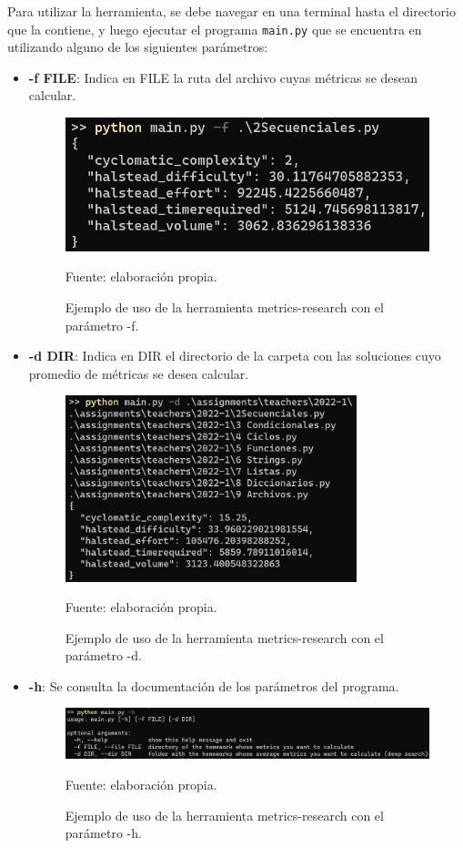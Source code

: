 \documentclass[letterpaper,12pt]{article}
\begin{document}
Para utilizar la herramienta, se debe navegar en una terminal hasta el directorio que la contiene, y luego ejecutar el programa \texttt{main.py} que se encuentra en utilizando alguno de los siguientes parámetros:

\begin{itemize}
  \item \textbf{-f FILE}: Indica en FILE la ruta del archivo cuyas métricas se desean calcular.
        \begin{figure}[H]
          \centering
          \includegraphics[width=1\textwidth]{figures/metricstool1.png}
          \caption{Ejemplo de uso de la herramienta metrics-research con el parámetro -f.} Fuente: elaboración propia.
          \label{metricstool1}
        \end{figure}
  \item \textbf{-d DIR}: Indica en DIR el directorio de la carpeta con las soluciones cuyo promedio de métricas se desea calcular.
        \begin{figure}[H]
          \centering
          \includegraphics[width=0.8\textwidth]{figures/metricstool2.png}
          \caption{Ejemplo de uso de la herramienta metrics-research con el parámetro -d.} Fuente: elaboración propia.
          \label{metricstool2}
        \end{figure}
  \item \textbf{-h}: Se consulta la documentación de los parámetros del programa.
        \begin{figure}[H]
          \centering
          \includegraphics[width=1\textwidth]{figures/metricstool3.png}
          \caption{Ejemplo de uso de la herramienta metrics-research con el parámetro -h.} Fuente: elaboración propia.
          \label{metricstool3}
        \end{figure}
\end{itemize}
\end{document}
